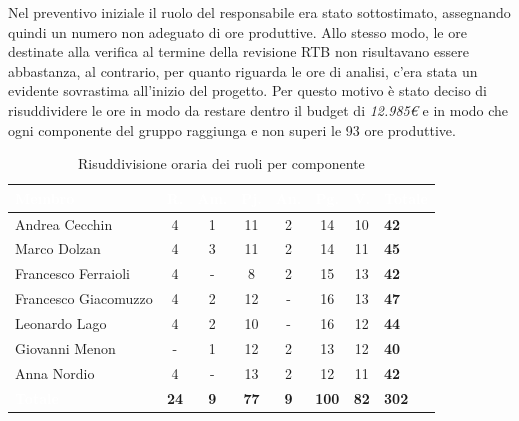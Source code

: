 Nel preventivo iniziale il ruolo del responsabile era stato sottostimato, assegnando quindi un numero non adeguato di ore produttive. Allo stesso modo, le ore destinate alla verifica al termine della revisione RTB non risultavano essere abbastanza, al contrario, per quanto riguarda le ore di analisi, c'era stata un evidente sovrastima all'inizio del progetto. Per questo motivo è stato deciso di risuddividere le ore in modo da restare dentro il budget di \textit{12.985€} e in modo che ogni componente del gruppo raggiunga e non superi le 93 ore produttive.
\setlength{\tabcolsep}{10pt}
\renewcommand{\arraystretch}{1.4}
\begin{table}[h]
    \centering
    \begin{tabularx}{\textwidth}{| l | c | c | c | c | c | c | X |}
        \hline
        \rowcolor{headerrow} \textbf{\textcolor{white}{Membro}} & \textbf{\textcolor{white}{R.}} & \textbf{\textcolor{white}{Am.}} & \textbf{\textcolor{white}{Pj.}} & \textbf{\textcolor{white}{An.}} & \textbf{\textcolor{white}{Pg.}} & \textbf{\textcolor{white}{V.}}&\textbf{\textcolor{white}{Totale}} \\
        \hline
        Andrea Cecchin & 4 & 1 & 11 & 2 & 14 & 10 & \textbf{42}\\
        \hline
        Marco Dolzan & 4 & 3 & 11 & 2 & 14 & 11 & \textbf{45}\\
        \hline
        Francesco Ferraioli & 4 & - & 8 & 2 & 15 & 13 &  \textbf{42}\\
        \hline  
        Francesco Giacomuzzo & 4 & 2 & 12 & - & 16 & 13 & \textbf{47}\\
        \hline
        Leonardo Lago & 4 & 2 & 10 & - & 16 & 12 &  \textbf{44}\\
        \hline
        Giovanni Menon & - & 1 & 12 & 2 & 13 & 12 &  \textbf{40}\\
        \hline
        Anna Nordio & 4 & - & 13 & 2 & 12 & 11 &  \textbf{42}\\
        \hline
    \cellcolor{headerrow} \textbf{\textcolor{white}{Totale}} & \textbf{24} & \textbf{9} & \textbf{77} & \textbf{9} & \textbf{100} & \textbf{82} & \textbf{302}\\
        \hline
    \end{tabularx} 
    \caption{Risuddivisione oraria dei ruoli per componente}
    \label{tab:risuddivisione}
\end{table}\\
\newpage
